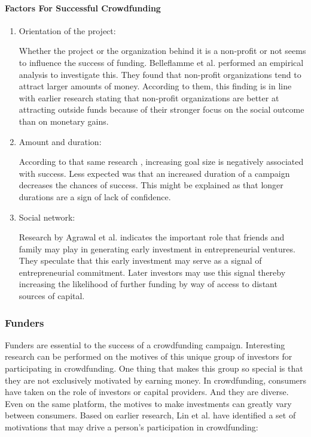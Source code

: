 \paragraph*{Factors For Successful Crowdfunding}
\begin{enumerate}
      \item Orientation of the project:
      
      Whether the project or the organization behind it is a non-profit or not
            seems to influence the success of funding. Belleflamme et al. \cite{doi:10.1080/13691066.2013.785151} performed an empirical analysis
            to investigate this. They found that non-profit organizations tend to attract larger amounts of money.
            According to them, this finding is in line with earlier research stating that non-profit organizations
            are better at attracting outside funds because of their stronger focus on the social outcome than on
            monetary gains.

      \item Amount and duration:
      
      According to that same research \cite{doi:10.1080/13691066.2013.785151}, increasing goal size is negatively associated
            with success. Less expected was that an increased duration of a campaign decreases the chances of
            success. This might be explained as that longer durations are a sign of lack of confidence.

      \item Social network:
      
      Research by Agrawal et al. \cite{NBERw16820} indicates the important role that friends and family may
            play in generating early investment in entrepreneurial ventures. They speculate that this early investment may serve as a signal of entrepreneurial commitment. Later investors may use this signal thereby
            increasing the likelihood of further funding by way of access to distant sources of capital.
\end{enumerate}


\subsubsection*{Funders}
Funders are essential to the success of a crowdfunding campaign. Interesting research can be performed on the motives of this unique group of investors for participating in crowdfunding. One thing that
makes this group so special is that they are not exclusively motivated by earning money.
In crowdfunding, consumers have taken on the role of investors or capital providers. And they are diverse. Even on the same platform, the motives to make investments can greatly vary between consumers.
Based on earlier research, Lin et al. \cite{doi:10.5465/ambpp.2014.209} have identified a set of motivations that may drive a person’s participation in crowdfunding:

